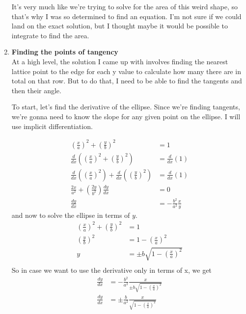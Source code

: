 \documentclass[11pt, oneside]{article}
\begin{document}
\begin{enumerate}
		It's very much like we're trying to solve for the area of this weird shape, so that's why I was so determined to find an equation. 
		I'm not sure if we could land on the exact solution, but I thought maybe it would be possible to integrate to find the area.

	\item \textbf{Finding the points of tangency}\\
		At a high level, the solution I came up with involves finding the nearest lattice point to the edge for each y value to calculate how many there
		are in total on that row. But to do that, I need to be able to find the tangents and then their angle.

		To start, let's find the derivative of the ellipse. Since we're finding tangents, we're gonna need to know the slope for any given point on the
		ellipse. I will use implicit differentiation.

		\begin{align*}
			\left(\frac x a\right)^2 + \left(\frac y b\right)^2 &= 1\\
			\frac d{dx}\left(\left(\frac x a\right)^2 + \left(\frac y b\right)^2\right) &= \frac d {dx} (1)\\
			\frac d{dx}\left(\left(\frac x a\right)^2\right) + \frac d{dx}\left(\left(\frac y b\right)^2\right) &= \frac d {dx} (1)\\
			\frac {2x} {a^2} + \left(\frac {2y} {b^2}\right)\frac {dy}{dx} &= 0\\
			\frac{dy}{dx}&=-\frac{b^2}{a^2}\frac{x}{y}
		\end{align*}
		and now to solve the ellipse in terms of $y$.
		\begin{align*}
			\left(\frac x a\right)^2 + \left(\frac y b\right)^2 &= 1\\
			\left(\frac y b\right)^2 &= 1- \left(\frac x a\right)^2 \\
			y &= \pm b\sqrt{1- \left(\frac x a\right)^2} \\
		\end{align*}
		So in case we want to use the derivative only in terms of x, we get
		\begin{align*}
			\frac{dy}{dx}&=-\frac{b^2}{a^2}\frac{x}{\pm b\sqrt{1- \left(\frac x a\right)^2}}\\
			\frac{dy}{dx}&=\pm\frac{b}{a^2}\frac{x}{\sqrt{1- \left(\frac x a\right)^2}}
		\end{align*}
		

\end{enumerate}
\end{document}
